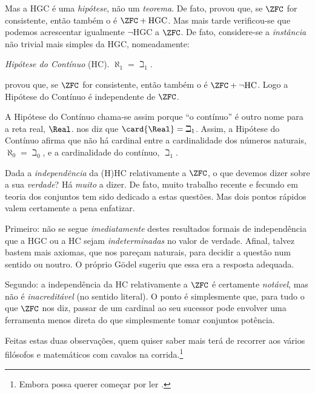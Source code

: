 \documentclass[../../../include/open-logic-section]{subfiles}
\begin{document}
Mas a HGC é uma \emph{hipótese}, não um \emph{teorema}. De fato,
\citet{Godel1938} provou que, se $\ZFC$ for consistente, então também o é
$\ZFC + \text{HGC}$. Mas mais tarde verificou-se que podemos acrescentar igualmente
$\lnot$HGC a $\ZFC$. De fato, considere-se a \emph{instância} não trivial mais simples
da HGC, nomeadamente: 

\begin{defish}
\emph{Hipótese do Contínuo} (HC). $\aleph_1 = \beth_1$. 
\end{defish}

\citet{Cohen1963} provou que, se $\ZFC$ for consistente, então também o é $\ZFC
+ \lnot\text{HC}$. Logo a Hipótese do Contínuo é independente de $\ZFC$.

A Hipótese do Contínuo chama-se assim porque ``o contínuo'' é
outro nome para a reta real, $\Real$.
 nos diz que $\card{\Real} =
\beth_1$. Assim, a Hipótese do Contínuo afirma que não há cardinal
entre a cardinalidade dos números naturais, $\aleph_0 = \beth_0$,
e a cardinalidade do contínuo, $\beth_1$.

Dada a \emph{independência} da (H)HC relativamente a $\ZFC$, o que devemos dizer
sobre a sua \emph{verdade}? Há \emph{muito} a dizer. De fato,
muito trabalho recente e fecundo em teoria dos conjuntos tem sido dedicado a
estas questões. Mas dois pontos rápidos valem certamente a pena
enfatizar.

Primeiro: não se segue \emph{imediatamente} destes resultados formais de independência que a HGC ou a HC sejam \emph{indeterminadas} no
valor de verdade. Afinal, talvez bastem mais axiomas, que nos pareçam naturais, para decidir a questão num sentido ou noutro. O próprio G\"odel sugeriu que essa era a resposta adequada.

Segundo: a independência da HC relativamente a $\ZFC$ é certamente
\emph{notável}, mas não é \emph{inacreditável} (no sentido literal). O ponto é simplesmente que, para tudo o que $\ZFC$ nos diz,
passar de um cardinal ao seu sucessor pode envolver uma ferramenta menos direta do que simplesmente tomar conjuntos potência.

Feitas estas duas observações, quem quiser saber mais terá de
recorrer aos vários filósofos e matemáticos com cavalos na corrida.\footnote{Embora possa querer começar por ler \citet[\S15.6]{Potter2004}.}
\end{document}

